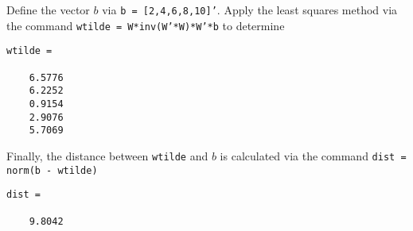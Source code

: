 \documentclass{ximera}
\begin{document}
\begin{computerExercise}
\begin{solution}
\begin{enumeratea}
\item Define the vector $b$ via {\tt b = [2,4,6,8,10]'}. Apply the least squares method via the command {\tt wtilde = W*inv(W'*W)*W'*b} to determine

\begin{verbatim}
wtilde =

    6.5776
    6.2252
    0.9154
    2.9076
    5.7069
\end{verbatim}

Finally, the distance between {\tt wtilde} and $b$ is calculated via the command
{\tt  dist = norm(b - wtilde)}
\begin{verbatim}
dist =

    9.8042
\end{verbatim}


\end{enumeratea}

\end{solution}
\end{computerExercise}
\end{document}
